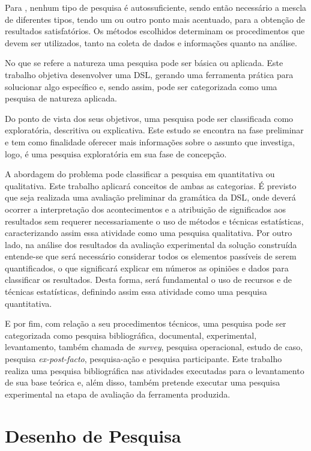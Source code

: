 Para , nenhum tipo de pesquisa é autossuficiente, sendo então necessário a mescla de diferentes tipos, tendo um ou outro ponto mais acentuado, para a obtenção de resultados satisfatórios. 
Os métodos escolhidos determinam os procedimentos que devem ser utilizados, tanto na coleta de dados e informações quanto na análise. 

No que se refere a natureza uma pesquisa pode ser básica ou aplicada. 
Este trabalho objetiva desenvolver uma \ac{DSL}, gerando uma ferramenta prática para solucionar algo específico e, sendo assim, pode ser categorizada como uma pesquisa de natureza aplicada.

Do ponto de vista dos seus objetivos, uma pesquisa pode ser classificada como exploratória, descritiva ou explicativa. 
Este estudo se encontra na fase preliminar e tem como finalidade oferecer mais informações sobre o assunto que investiga, logo, é uma pesquisa exploratória em sua fase de concepção. 

A abordagem do problema pode classificar a pesquisa em quantitativa ou qualitativa. 
Este trabalho aplicará conceitos de ambas as categorias.
É previsto que seja realizada uma avaliação preliminar da gramática da \ac{DSL}, onde deverá ocorrer a interpretação dos acontecimentos e a atribuição de significados aos resultados sem requerer necessariamente o uso de métodos e técnicas estatísticas, caracterizando assim essa atividade como uma pesquisa qualitativa. 
Por outro lado, na análise dos resultados da avaliação experimental da solução construída entende-se que será necessário considerar todos os elementos passíveis de serem quantificados, o que significará explicar em números as opiniões e dados para classificar os resultados. Desta forma, será fundamental o uso de recursos e de técnicas estatísticas, definindo assim essa atividade como uma pesquisa quantitativa.

E por fim, com relação a seu procedimentos técnicos, uma pesquisa pode ser categorizada como pesquisa bibliográfica, documental, experimental, levantamento, também chamada de \textit{survey}, pesquisa operacional, estudo de caso, pesquisa \textit{ex-post-facto}, pesquisa-ação e pesquisa participante. 
Este trabalho realiza uma pesquisa bibliográfica nas atividades executadas para o levantamento de sua base teórica e, além disso, também pretende executar uma pesquisa experimental na etapa de avaliação da ferramenta produzida.

\section{Desenho de Pesquisa} \label{sec:DesenhoPesquisa}

